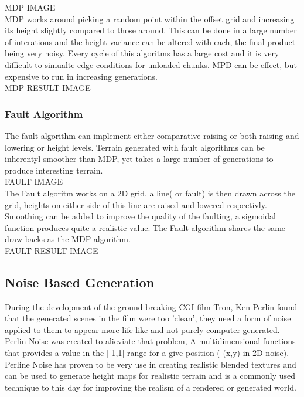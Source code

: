 MDP IMAGE\\

MDP works around picking a random point within the offset grid and increasing its
height slightly compared to those around. This can be done in a large number of 
interations and the height variance can be altered with each, the final product 
being very noisy. Every cycle of this algoritms has a large cost and it is very
difficult to simualte edge conditions for unloaded chunks. MPD can be effect, but
expensive to run in increasing generations.\\

MDP RESULT IMAGE\\

\subsubsection*{Fault Algorithm}
The fault algorithm can implement either comparative raising or both raising and
lowering or height levels. Terrain generated with fault algorithms can be 
inherentyl smoother than MDP, yet takes a large number of generations to produce
interesting terrain.\\

FAULT IMAGE\\

The Fault algoritm works on a 2D grid, a line( or fault) is then drawn across the
grid, heights on either side of this line are raised and lowered respectivly.
Smoothing can be added to improve the quality of the faulting, a sigmoidal 
function produces quite a realistic value. The Fault algorithm shares the same
draw backs as the MDP algorithm.\\

FAULT RESULT IMAGE\\

\subsection{Noise Based Generation}
During the development of the ground breaking CGI film Tron, Ken Perlin found 
that the generated scenes in the film were too 'clean', they need a form of noise
applied to them to appear more life like and not purely computer generated. 
Perlin Noise was created to alieviate that problem, A multidimensional functions
that provides a value in the [-1,1] range for a give position ( (x,y) in 2D 
noise). Perline Noise has proven to be very use in creating realistic blended 
textures and can be used to generate height maps for realistic terrain and is a 
commonly used technique to this day for improving the realism of a rendered or
generated world.\\

